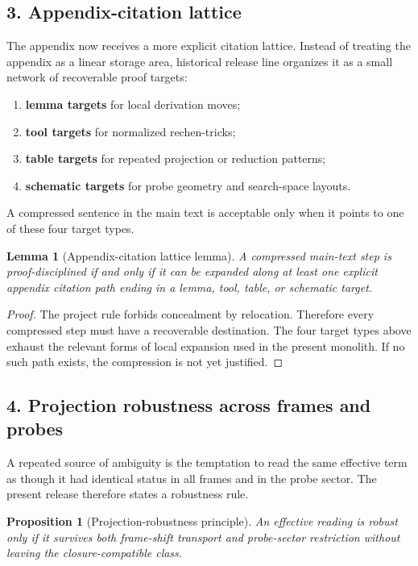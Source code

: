 \documentclass[12pt,a4paper]{article}
\DeclareRobustCommand{\QSCver}[1]{archival stage}
\newtheorem{lemma}[theorem]{Lemma}
\newtheorem{proposition}[theorem]{Proposition}
\renewcommand{\QSCver}[1]{historical release line}
\begin{document}
\subsection*{3. Appendix-citation lattice}
The appendix now receives a more explicit citation lattice. Instead of treating
the appendix as a linear storage area, \QSCver{v1.5.0} organizes it as a small
network of recoverable proof targets:
\begin{enumerate}[leftmargin=2em]
 \item \textbf{lemma targets} for local derivation moves;
 \item \textbf{tool targets} for normalized rechen-tricks;
 \item \textbf{table targets} for repeated projection or reduction patterns;
 \item \textbf{schematic targets} for probe geometry and search-space layouts.
\end{enumerate}
A compressed sentence in the main text is acceptable only when it points to one
of these four target types.

\begin{lemma}[Appendix-citation lattice lemma]
\label{lem:appendix-citation-lattice-lemma}
A compressed main-text step is proof-disciplined if and only if it can be
expanded along at least one explicit appendix citation path ending in a lemma,
tool, table, or schematic target.
\end{lemma}

\begin{proof}
The project rule forbids concealment by relocation. Therefore every compressed
step must have a recoverable destination. The four target types above exhaust
the relevant forms of local expansion used in the present monolith. If no such
path exists, the compression is not yet justified.
\end{proof}

\subsection*{4. Projection robustness across frames and probes}
A repeated source of ambiguity is the temptation to read the same effective term
as though it had identical status in all frames and in the probe sector. The
present release therefore states a robustness rule.

\begin{proposition}[Projection-robustness principle]
\label{prop:projection-robustness}
An effective reading is robust only if it survives both frame-shift transport and
probe-sector restriction without leaving the closure-compatible class.
\end{proposition}
\end{document}
